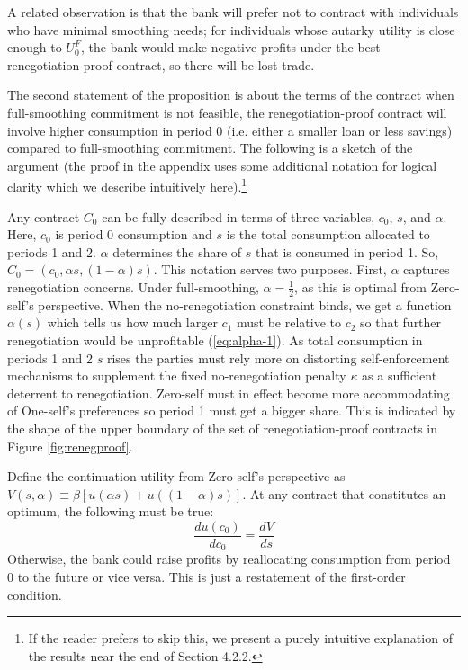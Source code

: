 \documentclass[11pt,english]{article}
\theoremstyle{plain}
\theoremstyle{definition}
\begin{document}
A related observation is that the bank will prefer not to contract
with individuals who have minimal smoothing needs; for individuals
whose autarky utility is close enough to $U_{0}^{F}$, the bank would
make negative profits under the best renegotiation-proof contract,
so there will be lost trade.

The second statement of the proposition is about the terms of the
contract \textendash{} when full-smoothing commitment is not feasible,
the renegotiation-proof contract will involve higher consumption in
period 0 (i.e. either a smaller loan or less savings) compared to
full-smoothing commitment. The following is a sketch of the argument
(the proof in the appendix uses some additional notation for logical
clarity which we describe intuitively here).\footnote{If the reader prefers to skip this, we present a purely intuitive
explanation of the results near the end of Section 4.2.2.}

Any contract $C_{0}$ can be fully described in terms of three variables,
$c_{0}$, $s$, and $\alpha$. Here, $c_{0}$ is period 0 consumption
and $s$ is the total consumption allocated to periods 1 and 2. $\alpha$
determines the share of $s$ that is consumed in period 1. So, $C_{0}=\left(c_{0},\alpha s,\left(1-\alpha\right)s\right)$.
This notation serves two purposes. First, $\alpha$ captures renegotiation
concerns. Under full-smoothing, $\alpha=\frac{1}{2}$, as this is
optimal from Zero-self's perspective. When the no-renegotiation constraint
binds, we get a function $\alpha\left(s\right)$ which tells us how
much larger $c_{1}$ must be relative to $c_{2}$ so that further
renegotiation would be unprofitable (\ref{eq:alpha-1}). As total
consumption in periods 1 and 2 $s$ rises the parties must rely more
on distorting self-enforcement mechanisms to supplement the fixed
no-renegotiation penalty $\kappa$ as a sufficient deterrent to renegotiation.
Zero-self must in effect become more accommodating of One-self's preferences
so period 1 must get a bigger share. This is indicated by the shape
of the upper boundary of the set of renegotiation-proof contracts
in Figure \ref{fig:renegproof}.

Define the continuation utility from Zero-self's perspective as $V\left(s,\alpha\right)\equiv\beta\left[u\left(\alpha s\right)+u\left(\left(1-\alpha\right)s\right)\right]$.
At any contract that constitutes an optimum, the following must be
true: 
\begin{equation}
\frac{du\left(c_{0}\right)}{dc_{0}}=\frac{dV}{ds}\label{eq:foc-newnotation}
\end{equation}
Otherwise, the bank could raise profits by reallocating consumption
from period 0 to the future or vice versa. This is just a restatement
of the first-order condition.
\end{document}
